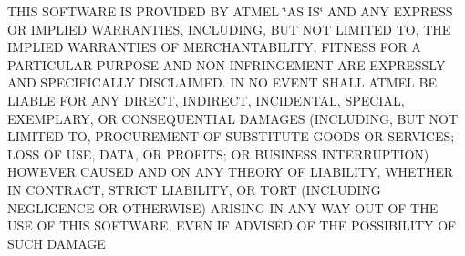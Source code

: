 T\-H\-I\-S S\-O\-F\-T\-W\-A\-R\-E I\-S P\-R\-O\-V\-I\-D\-E\-D B\-Y A\-T\-M\-E\-L \char`\"{}\-A\-S I\-S\char`\"{} A\-N\-D A\-N\-Y E\-X\-P\-R\-E\-S\-S O\-R I\-M\-P\-L\-I\-E\-D W\-A\-R\-R\-A\-N\-T\-I\-E\-S, I\-N\-C\-L\-U\-D\-I\-N\-G, B\-U\-T N\-O\-T L\-I\-M\-I\-T\-E\-D T\-O, T\-H\-E I\-M\-P\-L\-I\-E\-D W\-A\-R\-R\-A\-N\-T\-I\-E\-S O\-F M\-E\-R\-C\-H\-A\-N\-T\-A\-B\-I\-L\-I\-T\-Y, F\-I\-T\-N\-E\-S\-S F\-O\-R A P\-A\-R\-T\-I\-C\-U\-L\-A\-R P\-U\-R\-P\-O\-S\-E A\-N\-D N\-O\-N-\/\-I\-N\-F\-R\-I\-N\-G\-E\-M\-E\-N\-T A\-R\-E E\-X\-P\-R\-E\-S\-S\-L\-Y A\-N\-D S\-P\-E\-C\-I\-F\-I\-C\-A\-L\-L\-Y D\-I\-S\-C\-L\-A\-I\-M\-E\-D. I\-N N\-O E\-V\-E\-N\-T S\-H\-A\-L\-L A\-T\-M\-E\-L B\-E L\-I\-A\-B\-L\-E F\-O\-R A\-N\-Y D\-I\-R\-E\-C\-T, I\-N\-D\-I\-R\-E\-C\-T, I\-N\-C\-I\-D\-E\-N\-T\-A\-L, S\-P\-E\-C\-I\-A\-L, E\-X\-E\-M\-P\-L\-A\-R\-Y, O\-R C\-O\-N\-S\-E\-Q\-U\-E\-N\-T\-I\-A\-L D\-A\-M\-A\-G\-E\-S (I\-N\-C\-L\-U\-D\-I\-N\-G, B\-U\-T N\-O\-T L\-I\-M\-I\-T\-E\-D T\-O, P\-R\-O\-C\-U\-R\-E\-M\-E\-N\-T O\-F S\-U\-B\-S\-T\-I\-T\-U\-T\-E G\-O\-O\-D\-S O\-R S\-E\-R\-V\-I\-C\-E\-S; L\-O\-S\-S O\-F U\-S\-E, D\-A\-T\-A, O\-R P\-R\-O\-F\-I\-T\-S; O\-R B\-U\-S\-I\-N\-E\-S\-S I\-N\-T\-E\-R\-R\-U\-P\-T\-I\-O\-N) H\-O\-W\-E\-V\-E\-R C\-A\-U\-S\-E\-D A\-N\-D O\-N A\-N\-Y T\-H\-E\-O\-R\-Y O\-F L\-I\-A\-B\-I\-L\-I\-T\-Y, W\-H\-E\-T\-H\-E\-R I\-N C\-O\-N\-T\-R\-A\-C\-T, S\-T\-R\-I\-C\-T L\-I\-A\-B\-I\-L\-I\-T\-Y, O\-R T\-O\-R\-T (I\-N\-C\-L\-U\-D\-I\-N\-G N\-E\-G\-L\-I\-G\-E\-N\-C\-E O\-R O\-T\-H\-E\-R\-W\-I\-S\-E) A\-R\-I\-S\-I\-N\-G I\-N A\-N\-Y W\-A\-Y O\-U\-T O\-F T\-H\-E U\-S\-E O\-F T\-H\-I\-S S\-O\-F\-T\-W\-A\-R\-E, E\-V\-E\-N I\-F A\-D\-V\-I\-S\-E\-D O\-F T\-H\-E P\-O\-S\-S\-I\-B\-I\-L\-I\-T\-Y O\-F S\-U\-C\-H D\-A\-M\-A\-G\-E 